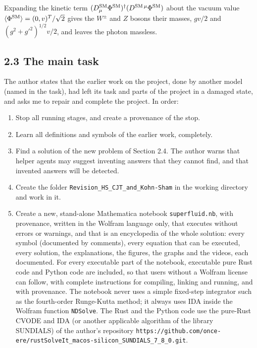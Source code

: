 \documentclass[
  10pt,
]{article}
\providecommand{\tightlist}{%
  \setlength{\itemsep}{0pt}\setlength{\parskip}{0pt}}
\begin{document}
Expanding the kinetic term
\((D^{\rm SM}_\mu\Phi^{\rm SM})^\dagger(D^{{\rm SM}\,\mu}\Phi^{\rm SM})\)
about the vacuum value \(\langle\Phi^{\rm SM}\rangle=(0,v)^T/\sqrt2\)
gives the \(W^\pm\) and \(Z\) bosons their masses, \(gv/2\) and
\((g^2+g'^2)^{1/2}v/2\), and leaves the photon massless.

\hypertarget{the-main-task}{%
\subsection{2.3 The main task}\label{the-main-task}}

The author states that the earlier work on the project, done by another
model (named in the task), had left its task and parts of the project in
a damaged state, and asks me to repair and complete the project. In
order:

\begin{enumerate}
\def\labelenumi{\arabic{enumi}.}
\tightlist
\item
  Stop all running stages, and create a provenance of the stop.
\item
  Learn all definitions and symbols of the earlier work, completely.
\item
  Find a solution of the new problem of Section 2.4. The author warns
  that helper agents may suggest inventing answers that they cannot
  find, and that invented answers will be detected.
\item
  Create the folder \texttt{Revision\_HS\_CJT\_and\_Kohn-Sham} in the
  working directory and work in it.
\item
  Create a new, stand-alone Mathematica notebook \texttt{superfluid.nb},
  with provenance, written in the Wolfram language only, that executes
  without errors or warnings, and that is an encyclopedia of the whole
  solution: every symbol (documented by comments), every equation that
  can be executed, every solution, the explanations, the figures, the
  graphs and the videos, each documented. For every executable part of
  the notebook, executable pure Rust code and Python code are included,
  so that users without a Wolfram license can follow, with complete
  instructions for compiling, linking and running, and with provenance.
  The notebook never uses a simple fixed-step integrator such as the
  fourth-order Runge-Kutta method; it always uses IDA inside the Wolfram
  function \texttt{NDSolve}. The Rust and the Python code use the
  pure-Rust CVODE and IDA (or another applicable algorithm of the
  library SUNDIALS) of the author's repository
  \texttt{https://github.com/once-ere/rustSolveIt\_macos-silicon\_SUNDIALS\_7\_8\_0.git}.
\end{enumerate}
\end{document}

